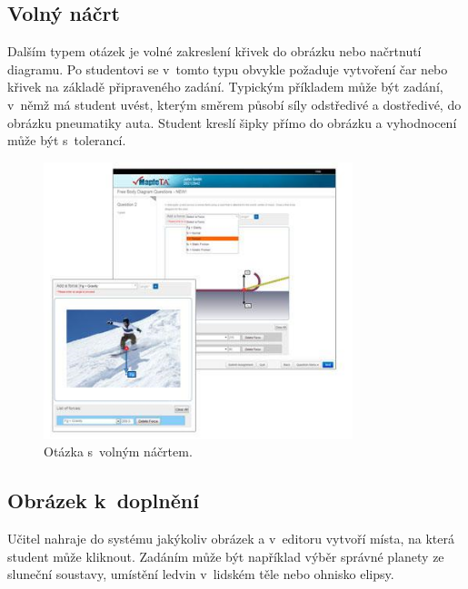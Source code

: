 \documentclass[
print,
  11pt,
  table,   
  nolof,    
  nolot,
  oneside,final
]{fithesis3}
\begin{document}
	\subsection{Volný náčrt}
Dalším typem otázek je volné zakreslení křivek do obrázku nebo načrtnutí diagramu. Po studentovi se v~tomto typu obvykle požaduje vytvoření čar nebo křivek na základě připraveného zadání. Typickým příkladem může být zadání, v~němž má student uvést, kterým směrem působí síly odstředivé a dostředivé, do obrázku pneumatiky auta. Student kreslí šipky přímo do obrázku a vyhodnocení může být s~tolerancí.
  		\begin{figure}[hbt]
		  \begin{center}
		    \includegraphics[width=90mm]{images/MapleTA_paint.png}
		   \end{center}
		  \caption{Otázka s~volným náčrtem.  \cite{maple-question}}
		  \label{fig:maplepaint}
		\end{figure}

	\subsection{Obrázek k~doplnění}
Učitel nahraje do systému jakýkoliv obrázek a v~editoru vytvoří místa, na která student může kliknout. Zadáním může být například výběr správné planety ze sluneční soustavy, umístění ledvin v~lidském těle nebo ohnisko elipsy.
 
\end{document}
